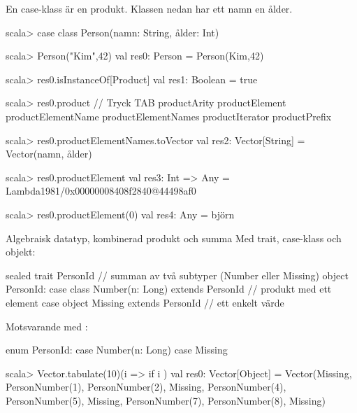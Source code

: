 \begin{Slide}{En case-klass är en produkt.}
Klassen  nedan har ett namn  en ålder.
\begin{REPL}
scala> case class Person(namn: String, ålder: Int)

scala> Person("Kim",42)
val res0: Person = Person(Kim,42)

scala> res0.isInstanceOf[Product]
val res1: Boolean = true

scala> res0.product   // Tryck TAB
productArity          productElement    productElementName
productElementNames   productIterator   productPrefix
          
scala> res0.productElementNames.toVector
val res2: Vector[String] = Vector(namn, ålder)

scala> res0.productElement
val res3: Int => Any = Lambda1981/0x00000008408f2840@44498af0

scala> res0.productElement(0)
val res4: Any = björn

\end{REPL} 
\end{Slide}


\begin{Slide}{Algebraisk datatyp, kombinerad produkt och summa}\SlideFontSmall
Med trait, case-klass och objekt:
\begin{Code}
sealed trait PersonId // summan av två subtyper (Number eller Missing)
object PersonId:  
  case class Number(n: Long) extends PersonId  // produkt med ett element
  case object Missing extends PersonId         // ett enkelt värde
\end{Code}
Motsvarande med :
\begin{Code}
enum PersonId:
  case Number(n: Long)
  case Missing     
\end{Code}
\begin{REPLsmall}
scala> Vector.tabulate(10)(i => 
         if i %
       )
val res0: Vector[Object] = Vector(Missing, PersonNumber(1), PersonNumber(2), Missing, 
  PersonNumber(4), PersonNumber(5), Missing, PersonNumber(7), PersonNumber(8), Missing)
\end{REPLsmall}

\end{Slide}

